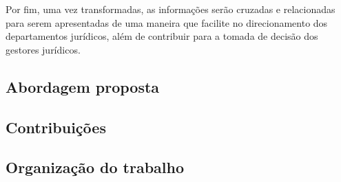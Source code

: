Por fim, uma vez transformadas, as informações serão cruzadas e relacionadas para serem apresentadas de uma maneira que facilite no direcionamento dos departamentos jurídicos, além de contribuir para a tomada de decisão dos gestores jurídicos.


\subsection{Abordagem proposta}

\subsection{Contribuições}

\subsection{Organização do trabalho}

